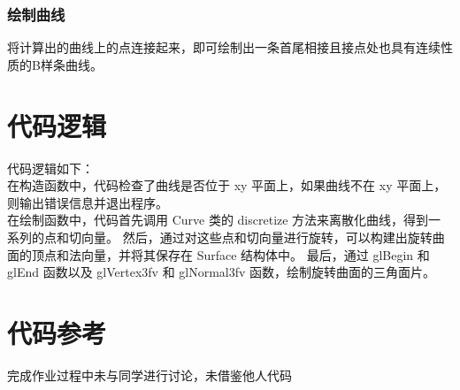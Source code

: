 \documentclass[12pt,a4paper]{article}
\begin{document}
\subsubsection{绘制曲线}
将计算出的曲线上的点连接起来，即可绘制出一条首尾相接且接点处也具有连续性质的B样条曲线。
\section{代码逻辑}
代码逻辑如下：\\
在构造函数中，代码检查了曲线是否位于 xy 平面上，如果曲线不在 xy 平面上，则输出错误信息并退出程序。\\
在绘制函数中，代码首先调用 Curve 类的 discretize 方法来离散化曲线，得到一系列的点和切向量。
然后，通过对这些点和切向量进行旋转，可以构建出旋转曲面的顶点和法向量，并将其保存在 Surface 结构体中。
最后，通过 glBegin 和 glEnd 函数以及 glVertex3fv 和 glNormal3fv 函数，绘制旋转曲面的三角面片。
\section{代码参考}
完成作业过程中未与同学进行讨论，未借鉴他人代码
\end{document}
